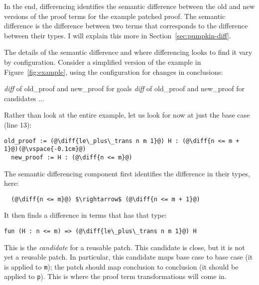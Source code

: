 In the end, differencing identifies the semantic difference between the old and new versions of the proof terms for the example patched proof.
The semantic difference is the difference between two terms that corresponds to the difference between their types.
I will explain this more in Section~\ref{sec:pumpkin-diff}.

The details of the semantic difference and where differencing looks to find it vary by configuration.
Consider a simplified version of the example in Figure~\ref{fig:example}, using the configuration for changes in conclusions:

\begin{algorithm}
\footnotesize
\begin{algorithmic}[1]
    \STATE \textit{diff}  of old\_proof and new\_proof for goals
    \STATE \textit{diff}  of old\_proof and new\_proof for candidates
    $\ldots$
\end{algorithmic}
\end{algorithm}
Rather than look at the entire example, let us look for now at just the base case (line 13):

\begin{lstlisting}[language=coq]
  old_proof := (@\diff{le\_plus\_trans n m 1}@) H : (@\diff{n <= m + 1}@)(@\vspace{-0.1cm}@)
  new_proof := H : (@\diff{n <= m}@)
\end{lstlisting}
The semantic differencing component first identifies the difference in their types, here:

\begin{lstlisting}
  (@\diff{n <= m}@) $\rightarrow$ (@\diff{n <= m + 1}@)
\end{lstlisting}
It then finds a difference in terms that has that type:

\begin{lstlisting}[language=coq]
  fun (H : n <= m) => (@\diff{le\_plus\_trans n m 1}@) H
\end{lstlisting}
This is the \emph{candidate} for a reusable patch.
This candidate is close, but it is not yet a reusable patch. In particular, this candidate
maps base case to base case (it is applied to \lstinline{m}); the patch should map conclusion to conclusion (it should
be applied to \lstinline{p}).
This is where the proof term transformations will come in.

